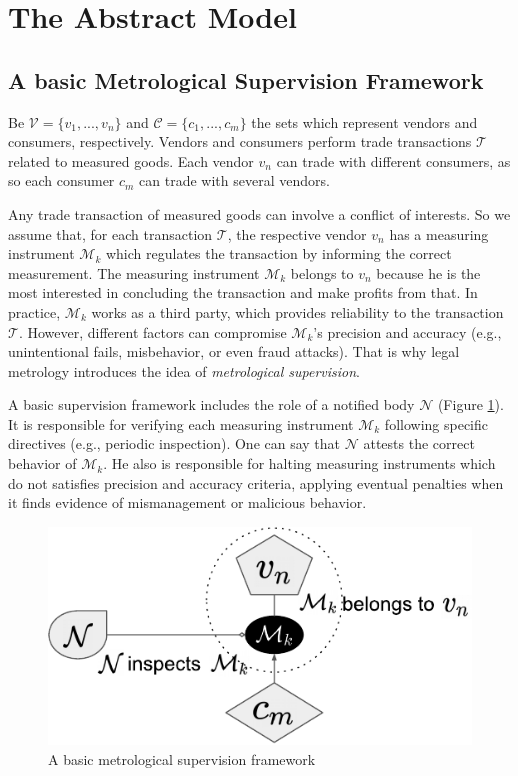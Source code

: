 \documentclass[sigplan]{acmart}
\begin{document}
\section{The Abstract Model}
\subsection{A basic Metrological Supervision Framework}
Be $\mathcal{V}=\{v_1, ..., v_n\}$ and $\mathcal{C}=\{c_1, ..., c_m\}$ the sets which represent vendors and consumers, respectively.
Vendors and consumers perform trade transactions $\mathcal{T}$ related to measured goods.
Each vendor $v_n$ can trade with different consumers, as so each consumer $c_m$ can trade with several vendors.

Any trade transaction of measured goods can involve a conflict of interests.
So we assume that, for each transaction $\mathcal{T}$, the respective vendor $v_n$ has a measuring instrument $\mathcal{M}_k$ which regulates the transaction by informing the correct measurement.
The measuring instrument $\mathcal{M}_k$ belongs to $v_n$ because he is the most interested in concluding the transaction and make profits from that.
In practice, $\mathcal{M}_k$ works as a third party, which provides reliability to the transaction $\mathcal{T}$.
However, different factors can compromise $\mathcal{M}_k$'s precision and accuracy (e.g., unintentional fails, misbehavior, or even fraud attacks).
That is why legal metrology introduces the idea of \emph{metrological supervision}.

A basic supervision framework includes the role of a notified body $\mathcal{N}$ (Figure \ref{f:basicframe1}).
It is responsible for verifying each measuring instrument $\mathcal{M}_k$ following specific directives (e.g., periodic inspection).
One can say that $\mathcal{N}$ attests the correct behavior of $\mathcal{M}_k$.
He also is responsible for halting measuring instruments which do not satisfies precision and accuracy criteria, applying eventual penalties when it finds evidence of mismanagement or malicious behavior.

\begin{figure}[!t]
\centering
\includegraphics[width=.4\textwidth]{basicframe1}
\caption{A basic metrological supervision framework}
\label{f:basicframe1}
\end{figure}
\end{document}
